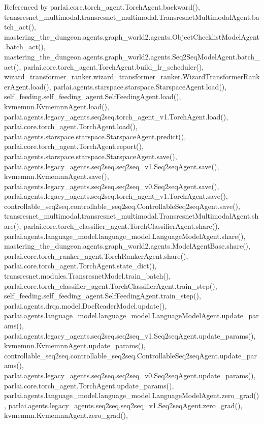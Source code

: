 Referenced by parlai.\+core.\+torch\+\_\+agent.\+Torch\+Agent.\+backward(), transresnet\+\_\+multimodal.\+transresnet\+\_\+multimodal.\+Transresnet\+Multimodal\+Agent.\+batch\+\_\+act(), mastering\+\_\+the\+\_\+dungeon.\+agents.\+graph\+\_\+world2.\+agents.\+Object\+Checklist\+Model\+Agent.\+batch\+\_\+act(), mastering\+\_\+the\+\_\+dungeon.\+agents.\+graph\+\_\+world2.\+agents.\+Seq2\+Seq\+Model\+Agent.\+batch\+\_\+act(), parlai.\+core.\+torch\+\_\+agent.\+Torch\+Agent.\+build\+\_\+lr\+\_\+scheduler(), wizard\+\_\+transformer\+\_\+ranker.\+wizard\+\_\+transformer\+\_\+ranker.\+Wizard\+Transformer\+Ranker\+Agent.\+load(), parlai.\+agents.\+starspace.\+starspace.\+Starspace\+Agent.\+load(), self\+\_\+feeding.\+self\+\_\+feeding\+\_\+agent.\+Self\+Feeding\+Agent.\+load(), kvmemnn.\+Kvmemnn\+Agent.\+load(), parlai.\+agents.\+legacy\+\_\+agents.\+seq2seq.\+torch\+\_\+agent\+\_\+v1.\+Torch\+Agent.\+load(), parlai.\+core.\+torch\+\_\+agent.\+Torch\+Agent.\+load(), parlai.\+agents.\+starspace.\+starspace.\+Starspace\+Agent.\+predict(), parlai.\+core.\+torch\+\_\+agent.\+Torch\+Agent.\+report(), parlai.\+agents.\+starspace.\+starspace.\+Starspace\+Agent.\+save(), parlai.\+agents.\+legacy\+\_\+agents.\+seq2seq.\+seq2seq\+\_\+v1.\+Seq2seq\+Agent.\+save(), kvmemnn.\+Kvmemnn\+Agent.\+save(), parlai.\+agents.\+legacy\+\_\+agents.\+seq2seq.\+seq2seq\+\_\+v0.\+Seq2seq\+Agent.\+save(), parlai.\+agents.\+legacy\+\_\+agents.\+seq2seq.\+torch\+\_\+agent\+\_\+v1.\+Torch\+Agent.\+save(), controllable\+\_\+seq2seq.\+controllable\+\_\+seq2seq.\+Controllable\+Seq2seq\+Agent.\+save(), transresnet\+\_\+multimodal.\+transresnet\+\_\+multimodal.\+Transresnet\+Multimodal\+Agent.\+share(), parlai.\+core.\+torch\+\_\+classifier\+\_\+agent.\+Torch\+Classifier\+Agent.\+share(), parlai.\+agents.\+language\+\_\+model.\+language\+\_\+model.\+Language\+Model\+Agent.\+share(), mastering\+\_\+the\+\_\+dungeon.\+agents.\+graph\+\_\+world2.\+agents.\+Model\+Agent\+Base.\+share(), parlai.\+core.\+torch\+\_\+ranker\+\_\+agent.\+Torch\+Ranker\+Agent.\+share(), parlai.\+core.\+torch\+\_\+agent.\+Torch\+Agent.\+state\+\_\+dict(), transresnet.\+modules.\+Transresnet\+Model.\+train\+\_\+batch(), parlai.\+core.\+torch\+\_\+classifier\+\_\+agent.\+Torch\+Classifier\+Agent.\+train\+\_\+step(), self\+\_\+feeding.\+self\+\_\+feeding\+\_\+agent.\+Self\+Feeding\+Agent.\+train\+\_\+step(), parlai.\+agents.\+drqa.\+model.\+Doc\+Reader\+Model.\+update(), parlai.\+agents.\+language\+\_\+model.\+language\+\_\+model.\+Language\+Model\+Agent.\+update\+\_\+params(), parlai.\+agents.\+legacy\+\_\+agents.\+seq2seq.\+seq2seq\+\_\+v1.\+Seq2seq\+Agent.\+update\+\_\+params(), kvmemnn.\+Kvmemnn\+Agent.\+update\+\_\+params(), controllable\+\_\+seq2seq.\+controllable\+\_\+seq2seq.\+Controllable\+Seq2seq\+Agent.\+update\+\_\+params(), parlai.\+agents.\+legacy\+\_\+agents.\+seq2seq.\+seq2seq\+\_\+v0.\+Seq2seq\+Agent.\+update\+\_\+params(), parlai.\+core.\+torch\+\_\+agent.\+Torch\+Agent.\+update\+\_\+params(), parlai.\+agents.\+language\+\_\+model.\+language\+\_\+model.\+Language\+Model\+Agent.\+zero\+\_\+grad(), parlai.\+agents.\+legacy\+\_\+agents.\+seq2seq.\+seq2seq\+\_\+v1.\+Seq2seq\+Agent.\+zero\+\_\+grad(), kvmemnn.\+Kvmemnn\+Agent.\+zero\+\_\+grad(), 